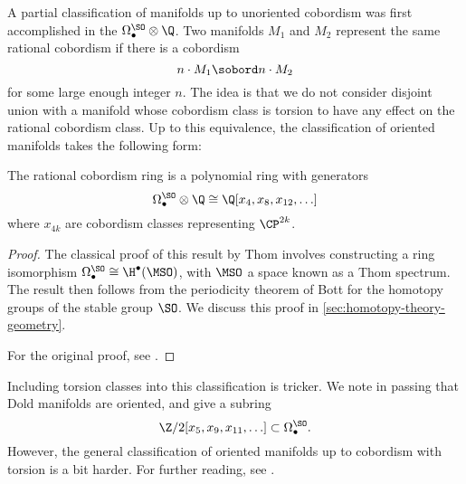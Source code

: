 A partial classification of manifolds up to unoriented cobordism was first accomplished in the  $\Omega_\bullet^\SO\otimes \Q$. Two manifolds $M_1$ and $M_2$ represent the same rational cobordism if there is a cobordism
\[
		n\cdot M_1 \sobord n\cdot M_2
\]
for some large enough integer $n$. The idea is that we do not consider disjoint union with a manifold whose cobordism class is torsion to have any effect on the rational cobordism class. Up to this equivalence, the classification of oriented manifolds takes the following form:

\begin{theorem}[Thom]\label{thm:oriented-cobordism-structure}
	The rational cobordism ring is a polynomial ring with generators
	\[
		\Omega_\bullet^\SO\otimes \Q \cong \Q[x_4, x_8, x_{12}, \ldots]
	\]
	where $x_{4k}$ are cobordism classes representing $\CP^{2k}$.
\end{theorem}
\begin{proof}
	The classical proof of this result by Thom involves constructing a ring isomorphism $\Omega_\bullet^\SO \cong \H^\bullet(\MSO)$, with $\MSO$ a space known as a Thom spectrum. The result then follows from the periodicity theorem of Bott \cite{bott1959stable} for the homotopy groups of the stable group $\SO$. We discuss this proof in \cref{sec:homotopy-theory-geometry}.

	For the original proof, see \cite{thom1954}.
\end{proof}

Including torsion classes into this classification is tricker. We note in passing that Dold manifolds are oriented, and give a subring
\[
	\Z/2[x_5,x_9,x_{11},\ldots] \subset \Omega_\bullet^\SO.
\]
However, the general classification of oriented manifolds up to cobordism with torsion is a bit harder. For further reading, see .

